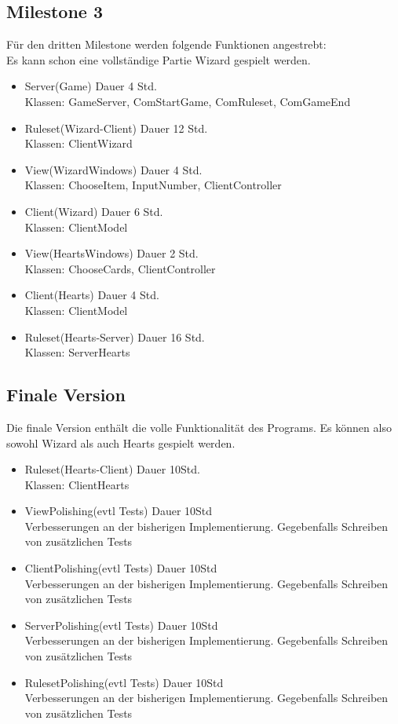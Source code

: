 \documentclass[twoside]{article}
\begin{document}
\subsection{Milestone 3}
Für den dritten Milestone werden folgende Funktionen angestrebt:\\
Es kann schon eine vollständige Partie Wizard gespielt werden.\\
\begin{itemize}
\item Server(Game) Dauer 4 Std. \\
Klassen: GameServer, ComStartGame, ComRuleset, ComGameEnd
\item Ruleset(Wizard-Client) Dauer 12 Std. \\
Klassen: ClientWizard
\item View(WizardWindows) Dauer 4 Std. \\
Klassen: ChooseItem, InputNumber, ClientController
\item Client(Wizard) Dauer 6 Std. \\
Klassen: ClientModel
\item View(HeartsWindows) Dauer 2 Std. \\
Klassen: ChooseCards, ClientController
\item Client(Hearts) Dauer 4 Std. \\
Klassen: ClientModel
\item Ruleset(Hearts-Server) Dauer 16 Std. \\
Klassen: ServerHearts
\end{itemize}

\subsection{Finale Version}
Die finale Version enthält die volle Funktionalität des Programs.
Es können also sowohl Wizard als auch Hearts gespielt werden.\\
\begin{itemize}
\item Ruleset(Hearts-Client) Dauer 10Std. \\
Klassen: ClientHearts
\item ViewPolishing(evtl Tests) Dauer 10Std \\
Verbesserungen an der bisherigen Implementierung. Gegebenfalls Schreiben von zusätzlichen Tests
\item ClientPolishing(evtl Tests) Dauer 10Std \\
Verbesserungen an der bisherigen Implementierung. Gegebenfalls Schreiben von zusätzlichen Tests
\item ServerPolishing(evtl Tests) Dauer 10Std \\
Verbesserungen an der bisherigen Implementierung. Gegebenfalls Schreiben von zusätzlichen Tests
\item RulesetPolishing(evtl Tests) Dauer 10Std \\
Verbesserungen an der bisherigen Implementierung. Gegebenfalls Schreiben von zusätzlichen Tests
\end{itemize}
\newpage
\end{document}
